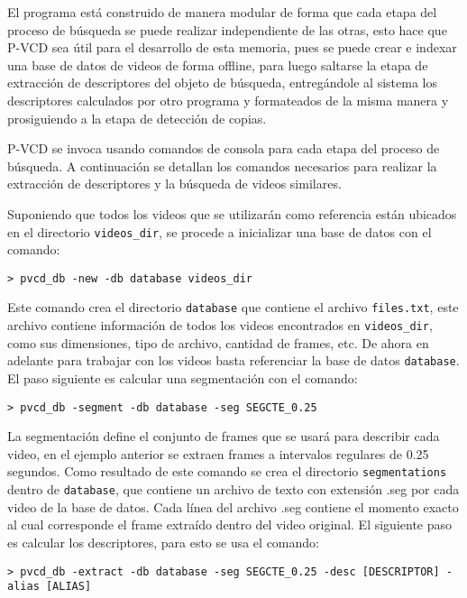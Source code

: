 El programa está construido de manera modular de forma que cada etapa del proceso de búsqueda se puede realizar independiente de las otras, esto hace que P-VCD sea útil para el desarrollo de esta memoria, pues se puede crear e indexar una base de datos de videos de forma offline, para luego saltarse la etapa de extracción de descriptores del objeto de búsqueda, entregándole al sistema los descriptores calculados por otro programa y formateados de la misma manera y prosiguiendo a la etapa de detección de copias.

P-VCD se invoca usando comandos de consola para cada etapa del proceso de búsqueda. A continuación se detallan los comandos necesarios para realizar la extracción de descriptores y la búsqueda de videos similares.

Suponiendo que todos los videos que se utilizarán como referencia están ubicados en el directorio \texttt{videos\_dir}, se procede a inicializar una base de datos con el comando:
\begin{lstlisting}[style=BashInputStyle]
    > pvcd_db -new -db database videos_dir
\end{lstlisting}

Este comando crea el directorio \texttt{database} que contiene el archivo \texttt{files.txt}, este archivo contiene información de todos los videos encontrados en \texttt{videos\_dir}, como sus dimensiones, tipo de archivo, cantidad de frames, etc. De ahora en adelante para trabajar con los videos basta referenciar la base de datos \texttt{database}. El paso siguiente es calcular una segmentación con el comando:
\begin{lstlisting}[style=BashInputStyle]
    > pvcd_db -segment -db database -seg SEGCTE_0.25
\end{lstlisting}
La segmentación define el conjunto de frames que se usará para describir cada video, en el ejemplo anterior se extraen frames a intervalos regulares de 0.25 segundos. Como resultado de este comando se crea el directorio \texttt{segmentations} dentro de \texttt{database}, que contiene un archivo de texto con extensión .seg por cada video de la base de datos. Cada línea del archivo .seg contiene el momento exacto al cual corresponde el frame extraído dentro del video original.
El siguiente paso es calcular los descriptores, para esto se usa el comando:
\begin{lstlisting}[style=BashInputStyle]
    > pvcd_db -extract -db database -seg SEGCTE_0.25 -desc [DESCRIPTOR] -alias [ALIAS]
\end{lstlisting}

